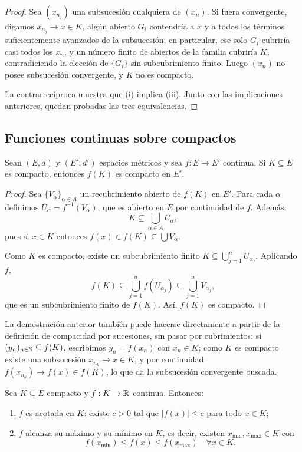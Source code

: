 \begin{proof}
Sea $(x_{n_j})$ una subsucesión cualquiera de $(x_n)$.
Si fuera convergente, digamos $x_{n_j}\to x\in K$, algún abierto $G_i$
contendría a $x$ y a todos los términos suficientemente avanzados de
la subsucesión; en particular, ese solo $G_i$ cubriría casi todos los
$x_n$, y un número finito de abiertos de la familia cubriría $K$,
contradiciendo la elección de $\{G_i\}$ sin subcubrimiento finito.
Luego $(x_n)$ no posee subsucesión convergente, y $K$ no es compacto.

La contrarrecíproca muestra que (i) implica (iii). Junto con las
implicaciones anteriores, quedan probadas las tres equivalencias.
\end{proof}

\subsection{Funciones continuas sobre compactos}

\begin{teo}
Sean $(E,d)$ y $(E',d')$ espacios métricos y sea
$f : E \to E'$ continua. Si $K \subseteq E$ es compacto, entonces
$f(K)$ es compacto en $E'$.
\end{teo}

\begin{proof}
Sea $\{V_\alpha\}_{\alpha\in A}$ un recubrimiento abierto de $f(K)$ en $E'$.
Para cada $\alpha$ definimos $U_\alpha = f^{-1}(V_\alpha)$, que es abierto
en $E$ por continuidad de $f$. Además,
\[
K \subseteq \bigcup_{\alpha\in A} U_\alpha,
\]
pues si $x\in K$ entonces $f(x)\in f(K)\subseteq \bigcup V_\alpha$.

Como $K$ es compacto, existe un subcubrimiento finito
$K \subseteq \bigcup_{j=1}^n U_{\alpha_j}$. Aplicando $f$,
\[
f(K) \subseteq \bigcup_{j=1}^n f(U_{\alpha_j})
\subseteq \bigcup_{j=1}^n V_{\alpha_j},
\]
que es un subcubrimiento finito de $f(K)$. Así, $f(K)$ es compacto.
\end{proof}

\begin{obs}
La demostración anterior también puede hacerse directamente a partir de
la definición de compacidad por sucesiones, sin pasar por cubrimientos:
si $(y_n)_{n\in\mathbb{N}}\subseteq f(K)$, escribimos $y_n=f(x_n)$ con
$x_n\in K$; como $K$ es compacto existe una subsucesión $x_{n_k}\to x\in
K$, y por continuidad $f(x_{n_k})\to f(x)\in f(K)$, lo que da la
subsucesión convergente buscada.
\end{obs}

\begin{cor}
Sea $K \subseteq E$ compacto y $f : K \to \mathbb{R}$ continua.
Entonces:
\begin{enumerate}[label=(\roman*)]
    \item $f$ es acotada en $K$: existe $c>0$ tal que
    $|f(x)|\le c$ para todo $x\in K$;
    \item $f$ alcanza su máximo y su mínimo en $K$, es decir,
    existen $x_{\min},x_{\max}\in K$ con
    \[
    f(x_{\min}) \le f(x) \le f(x_{\max}) \quad \forall x\in K.
    \]
\end{enumerate}
\end{cor}

